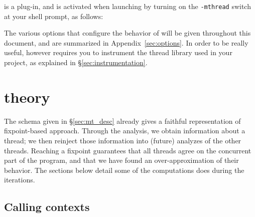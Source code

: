 \documentclass{frama-c-book}
\def\mysec#1{\S{\ref{sec:#1}}}
\def\myappdx#1{Appendix~{\ref{sec:#1}}}
\begin{document}
\mthread is a \FramaC plug-in, and is activated when launching \FramaC
by turning on the {\tt -mthread} switch at your shell prompt, as follows:
\begin{shell}
\end{shell}

The various options that configure the behavior of \mthread will be
given throughout this document, and are summarized in
\myappdx{options}. In order to be really useful,
\mthread however requires you to instrument the thread library used
in your \C project, as explained in \mysec{instrumentation}.


\chapter{\mthread theory}
\label{chap:mthread-theory}

The schema given in \S\ref{sec:mt_desc} already gives a faithful
representation of \mthread fixpoint-based approach.  Through the \Eva
analysis, we obtain information about a thread; we then reinject those
information into (future) analyzes of the other threads. Reaching a
fixpoint guarantees that all threads agree on the concurrent part of
the program, and that we have found an over-approximation of their
behavior. The sections below detail some of the computations \mthread
does during the iterations.


\section{Calling contexts}
\end{document}
